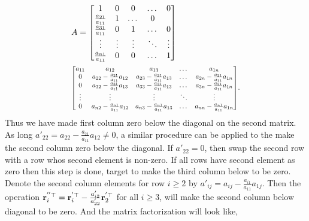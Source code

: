 \documentclass[twocolumn]{article}
\begin{document}
\begin{align*}
  &A=\begin{bmatrix} 1  & 0  &  0 &  \dots  & 0 \\
    \frac{a_{21}}{a_{11}} & 1  & \dots  &   0  \\
    \frac{a_{31}}{a_{11}} & 0  & 1 & \dots  &   0  \\
    \vdots  & \vdots &  \vdots  &   \ddots  &  \vdots   \\
    \frac{a_{n1}}{a_{11}} & 0 &  0   &  \dots  & 1
  \end{bmatrix}  \\
  &  \scalebox{0.8}{\mbox{$\begin{bmatrix}
        a_{11} & a_{12}  &  a_{13} &     \dots &  a_{1n} \\
        0 & a_{22}-\frac{a_{21}}{a_{11}}a_{12}  & a_{23}-\frac{a_{21}}{a_{11}}a_{13} &  \dots &  a_{2n} -\frac{a_{21}}{a_{11}}a_{1n}\\
        0 & a_{32} -\frac{a_{31}}{a_{11}}a_{13} &  a_{33}-\frac{a_{31}}{a_{11}}a_{13} &     \dots &  a_{3n}-\frac{a_{31}}{a_{11}}a_{1n} \\
        \vdots &  \vdots  & \vdots &  \ddots & \vdots \\
        0 & a_{n2}-\frac{a_{n1}}{a_{11}}a_{12}  &  a_{n3} -\frac{a_{n1}}{a_{11}}a_{13}&   \dots &  a_{nn}-\frac{a_{n1}}{a_{11}}a_{1n}
      \end{bmatrix}$}}.
\end{align*}
% 
Thus we  have made first  column   zero below  the  diagonal  on  the  second
matrix. As long $a'_{22} = a_{22} - \frac{a_{21}}{a_{11}}a_{12} \ne 0$,  a  similar procedure  can be  applied to the make the second
column  zero  below   the  diagonal. If $a'_{22} = 0$, then swap the second row
with a row whos second  element is non-zero. If all  rows  have   second element
as zero then this step  is done,  target  to   make  the third column  below to
be zero.  Denote the  second  column  elements  for
row  $i \ge 2$ by
$a'_{ij} = a_{ij}  - \frac{a_{i1}}{a_{11}}a_{1j}$.  Then   the  operation
$\mathbf{r}_{i}^{''\top} = \mathbf{r}_i^{'\top}  - \frac{a'_{i2}}{a'_{22}}\mathbf{r}_2^{'\top}$  for all
$i \ge 3$, will
make the second  column below diagonal  to be  zero. And the matrix
factorization will look  like,
% 
\end{document}
